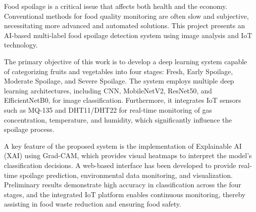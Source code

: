 \vspace{-1cm}



Food spoilage is a critical issue that affects both health and the economy. Conventional methods for food quality monitoring are often slow and subjective, necessitating more advanced and automated solutions. This project presents an AI-based multi-label food spoilage detection system using image analysis and IoT technology.

The primary objective of this work is to develop a deep learning system capable of categorizing fruits and vegetables into four stages: Fresh, Early Spoilage, Moderate Spoilage, and Severe Spoilage. The system employs multiple deep learning architectures, including CNN, MobileNetV2, ResNet50, and EfficientNetB0, for image classification. Furthermore, it integrates IoT sensors such as MQ-135 and DHT11/DHT22 for real-time monitoring of gas concentration, temperature, and humidity, which significantly influence the spoilage process.

A key feature of the proposed system is the implementation of Explainable AI (XAI) using Grad-CAM, which provides visual heatmaps to interpret the model's classification decisions. A web-based interface has been developed to provide real-time spoilage prediction, environmental data monitoring, and visualization. Preliminary results demonstrate high accuracy in classification across the four stages, and the integrated IoT platform enables continuous monitoring, thereby assisting in food waste reduction and ensuring food safety.

\pagebreak
